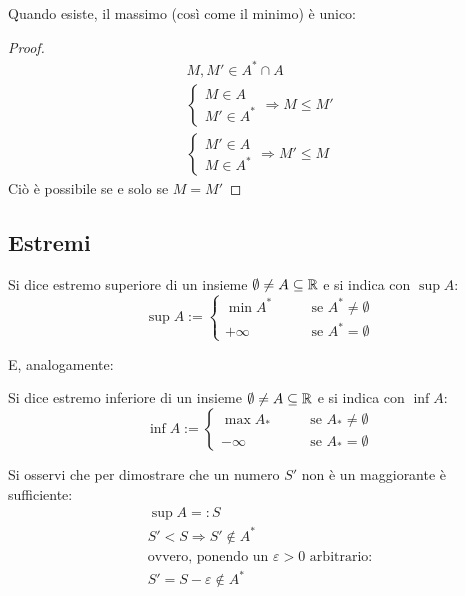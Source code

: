 Quando esiste, il massimo (così come il minimo) è unico:
\begin{proof}
	\begin{gather*}
		M,M'\in A^*\cap A\\
		\begin{cases}
			M\in A \\
			M'\in A^*
		\end{cases}\Rightarrow M\leq M'\\
		\begin{cases}
			M'\in A \\
			M\in A^*
		\end{cases}\Rightarrow M'\leq M
	\end{gather*}
	Ciò è possibile se e solo se $M=M'$
\end{proof}


\subsection{Estremi}
\begin{defin}
	Si dice estremo superiore di un insieme $\emptyset\neq A\subseteq\mathbb{R}$ e si indica con $\sup A$:
	\[
		\sup A:=
		\begin{cases}
			\min A^*\qquad & \text{se }A^*\neq\emptyset \\
			+\infty\qquad  & \text{se }A^*=\emptyset
		\end{cases}
	\]
\end{defin} E,
analogamente:
\begin{defin}
	Si dice estremo inferiore di un insieme $\emptyset\neq A\subseteq\mathbb{R}$ e si indica con $\inf A$:
	\[
		\inf A:=
		\begin{cases}
			\max A_*\qquad & \text{se  }A_*\neq\emptyset \\
			-\infty\qquad  & \text{se }A_*=\emptyset
		\end{cases}
	\]
\end{defin}
Si osservi che per dimostrare che un numero $S'$ non è un maggiorante è sufficiente:
\begin{gather*}
	\sup A=:S\\ S'<S\Rightarrow S'\notin A^*\\
	\text{ovvero, ponendo un $\varepsilon>0$ arbitrario:}\\
	S' = S-\varepsilon\notin A^*
\end{gather*}

